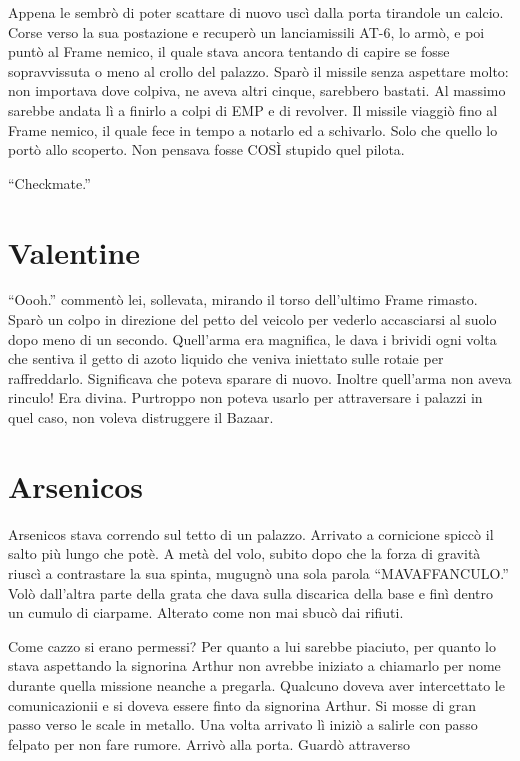     Appena le sembrò di poter scattare di nuovo uscì dalla porta tirandole un calcio. Corse verso la sua postazione e
    recuperò un lanciamissili AT-6, lo armò, e poi puntò al Frame nemico, il quale stava ancora tentando di capire se
    fosse sopravvissuta o meno al crollo del palazzo. Sparò il missile senza aspettare molto: non importava dove
    colpiva, ne aveva altri cinque, sarebbero bastati. Al massimo sarebbe andata lì a finirlo a colpi di EMP e di
    revolver. Il missile viaggiò fino al Frame nemico, il quale fece in tempo a notarlo ed a schivarlo. Solo che quello
    lo portò allo scoperto. Non pensava fosse COSÌ stupido quel pilota.

    ``Checkmate.''

  \section*{Valentine}

    ``Oooh.'' commentò lei, sollevata, mirando il torso dell'ultimo Frame rimasto. Sparò un colpo in direzione del petto del
    veicolo per vederlo accasciarsi al suolo dopo meno di un secondo. Quell'arma era magnifica, le dava i brividi ogni
    volta che sentiva il getto di azoto liquido che veniva iniettato sulle rotaie per raffreddarlo. Significava che
    poteva sparare di nuovo. Inoltre quell'arma non aveva rinculo! Era divina. Purtroppo non poteva usarlo per
    attraversare i palazzi in quel caso, non voleva distruggere il Bazaar.

  \section*{Arsenicos}

    Arsenicos stava correndo sul tetto di un palazzo. Arrivato a cornicione spiccò il salto più lungo che potè. A metà
    del volo, subito dopo che la forza di gravità riuscì a contrastare la sua spinta, mugugnò una sola parola
    ``MAVAFFANCULO.'' Volò dall'altra parte della grata che dava sulla discarica della base e finì dentro un cumulo di
    ciarpame. Alterato come non mai sbucò dai rifiuti.

    Come cazzo si erano permessi? Per quanto a lui sarebbe piaciuto, per quanto lo stava aspettando la signorina Arthur
    non avrebbe iniziato a chiamarlo per nome durante quella missione neanche a pregarla. Qualcuno doveva aver
    intercettato le comunicazionii e si doveva essere finto da signorina Arthur. Si mosse di gran passo verso
    le scale in metallo. Una volta arrivato lì iniziò a salirle con passo felpato per non fare rumore. Arrivò alla
    porta. Guardò attraverso 
